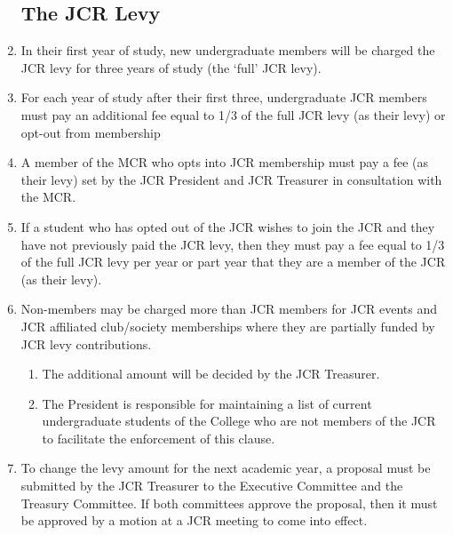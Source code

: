 \documentclass[12pt]{article}  %
\begin{document}
\begin{enumerate}
	\subsection{The JCR Levy}
	\item In their first year of study, new undergraduate members will be charged the JCR levy for three years of study (the ‘full’ JCR levy). 
	\item For each year of study after their first three, undergraduate JCR members must pay an additional fee equal to 1/3 of the full JCR levy (as their levy) or opt-out from membership
	\item A member of the MCR who opts into JCR membership must pay a fee (as their levy) set by the JCR President and JCR Treasurer in consultation with the MCR.
	\item If a student who has opted out of the JCR wishes to join the JCR and they have not previously paid the JCR levy, then they must pay a fee equal to 1/3 of the full JCR levy per year or part year that they are a member of the JCR (as their levy).
	\item Non-members may be charged more than JCR members for JCR events and JCR affiliated club/society memberships where they are partially funded by JCR levy contributions.
	\begin{enumerate}
		\item The additional amount will be decided by the JCR Treasurer.
		\item The President is responsible for maintaining a list of current undergraduate students of the College who are not members of the JCR to facilitate the enforcement of this clause.
	\end{enumerate}
	\item To change the levy amount for the next academic year, a proposal must be submitted by the JCR Treasurer to the Executive Committee and the Treasury Committee. If both committees approve the proposal, then it must be approved by a motion at a JCR meeting to come into effect.
\end{enumerate}
\end{document}
